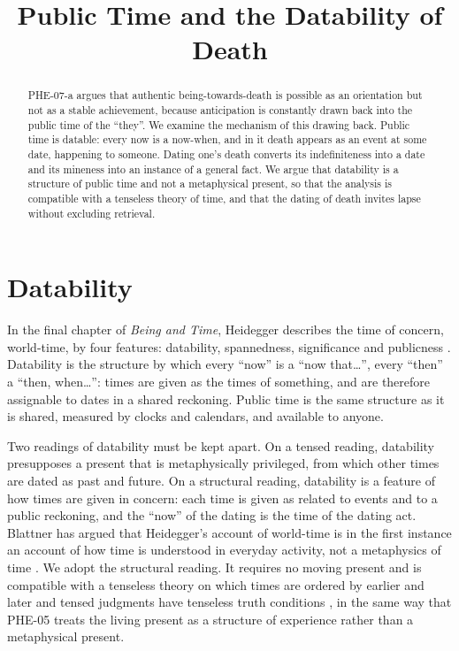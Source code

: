 \documentclass{situationist-preprint}
\title{Public Time and the Datability of Death}
\begin{document}
\maketitle

\begin{abstract}
PHE-07-a argues that authentic being-towards-death is possible as an orientation but not as a stable achievement, because anticipation is constantly drawn back into the public time of the \enquote{they}. We examine the mechanism of this drawing back. Public time is datable: every now is a now-when, and in it death appears as an event at some date, happening to someone. Dating one's death converts its indefiniteness into a date and its mineness into an instance of a general fact. We argue that datability is a structure of public time and not a metaphysical present, so that the analysis is compatible with a tenseless theory of time, and that the dating of death invites lapse without excluding retrieval.
\end{abstract}

\section{Datability}

In the final chapter of \emph{Being and Time}, Heidegger describes the time of concern, world-time, by four features: datability, spannedness, significance and publicness \citep[\S\S79--81]{Heidegger1927}. Datability is the structure by which every \enquote{now} is a \enquote{now that\dots}, every \enquote{then} a \enquote{then, when\dots}: times are given as the times of something, and are therefore assignable to dates in a shared reckoning. Public time is the same structure as it is shared, measured by clocks and calendars, and available to anyone.

Two readings of datability must be kept apart. On a tensed reading, datability presupposes a present that is metaphysically privileged, from which other times are dated as past and future. On a structural reading, datability is a feature of how times are given in concern: each time is given as related to events and to a public reckoning, and the \enquote{now} of the dating is the time of the dating act. Blattner has argued that Heidegger's account of world-time is in the first instance an account of how time is understood in everyday activity, not a metaphysics of time \citep{Blattner1999}. We adopt the structural reading. It requires no moving present and is compatible with a tenseless theory on which times are ordered by earlier and later and tensed judgments have tenseless truth conditions \citep{Mellor1998}, in the same way that PHE-05 treats the living present as a structure of experience rather than a metaphysical present.
\end{document}
